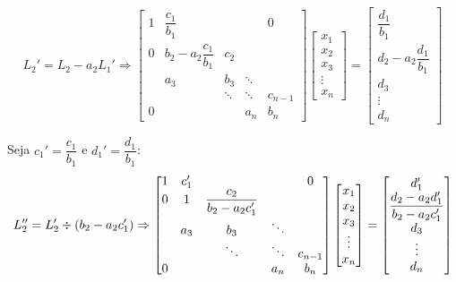 \begin{equation*}
	L_2' = L_2 - a_2L_1'  \Rightarrow
	\begin{bmatrix}
		1 & \dfrac{c_1}{b_1} &         &        & 0\\
		0 & b_2 - a_2\dfrac{c_1}{b_1} &   c_2   &        & \\
		    & a_3 &   b_3   & \ddots & \\
		    &     &  \ddots & \ddots & c_{n-1} \\
	     0  &     &         &  a_n   & b_n 
	\end{bmatrix}
	\begin{bmatrix}
		x_1 \\
		x_2 \\
		x_3 \\
		\vdots \\
		x_n
	\end{bmatrix}
	=\begin{bmatrix}
		\dfrac{d_1}{b_1} \\
		d_2 - a_2\dfrac{d_1}{b_1}\\
		d_3 \\
		\vdots \\
		d_n
	\end{bmatrix}
\end{equation*}

Seja $c_1' = \dfrac{c_1}{b_1}$ e $d_1' = \dfrac{d_1}{b_1}$:
\begin{equation*}
	L_2'' = L_2'\divisionsymbol (b_2-a_2c_1')  \Rightarrow
	\begin{bmatrix}
		1 & c_1' &         &        & 0\\
		0 & 1 &   \dfrac{c_2}{b_2-a_2c_1'}   &        & \\
		    & a_3 &   b_3   & \ddots & \\
		    &     &  \ddots & \ddots & c_{n-1} \\
	     0  &     &         &  a_n   & b_n 
	\end{bmatrix}
	\begin{bmatrix}
		x_1 \\
		x_2 \\
		x_3 \\
		\vdots \\
		x_n
	\end{bmatrix}
	=\begin{bmatrix}
		d_1' \\
		\dfrac{d_2 - a_2d_1'}{b_2-a_2c_1'}\\
		d_3 \\
		\vdots \\
		d_n
	\end{bmatrix}
\end{equation*}

